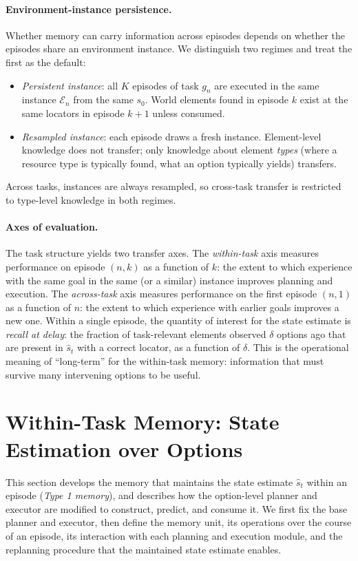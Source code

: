 \documentclass[11pt]{article}
\newcommand{\calE}{\mathcal{E}}
\newcommand{\shat}{\hat{s}}
\begin{document}
\paragraph{Environment-instance persistence.}
Whether memory can carry information across episodes depends on whether the episodes share an environment instance. We distinguish two regimes and treat the first as the default:
\begin{itemize}[leftmargin=1.5em,itemsep=1pt]
\item \emph{Persistent instance}: all $K$ episodes of task $g_n$ are executed in the same instance $\calE_n$ from the same $s_0$. World elements found in episode $k$ exist at the same locators in episode $k+1$ unless consumed.
\item \emph{Resampled instance}: each episode draws a fresh instance. Element-level knowledge does not transfer; only knowledge about element \emph{types} (where a resource type is typically found, what an option typically yields) transfers.
\end{itemize}
Across tasks, instances are always resampled, so cross-task transfer is restricted to type-level knowledge in both regimes.

\paragraph{Axes of evaluation.}
The task structure yields two transfer axes. The \emph{within-task} axis measures performance on episode $(n,k)$ as a function of $k$: the extent to which experience with the same goal in the same (or a similar) instance improves planning and execution. The \emph{across-task} axis measures performance on the first episode $(n,1)$ as a function of $n$: the extent to which experience with earlier goals improves a new one. Within a single episode, the quantity of interest for the state estimate is \emph{recall at delay}: the fraction of task-relevant elements observed $\delta$ options ago that are present in $\shat_t$ with a correct locator, as a function of $\delta$. This is the operational meaning of ``long-term'' for the within-task memory: information that must survive many intervening options to be useful.

\section{Within-Task Memory: State Estimation over Options}
\label{sec:type1}

This section develops the memory that maintains the state estimate $\shat_t$ within an episode (\emph{Type 1 memory}), and describes how the option-level planner and executor are modified to construct, predict, and consume it. We first fix the base planner and executor, then define the memory unit, its operations over the course of an episode, its interaction with each planning and execution module, and the replanning procedure that the maintained state estimate enables.
\end{document}
